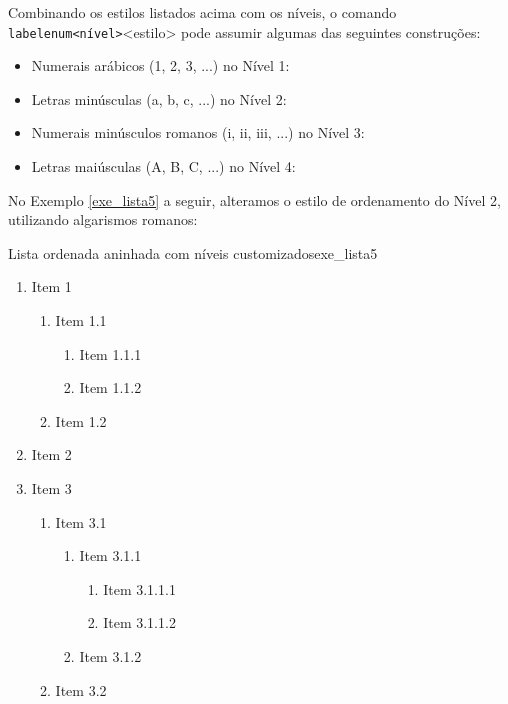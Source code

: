 Combinando os estilos listados acima com os níveis, o comando \texttt{labelenum<nível>}{<estilo>} pode assumir algumas das seguintes construções:

\begin{itemize}
    \item Numerais arábicos (1, 2, 3, ...) no Nível 1:\\
    \texttt{\renewcommand{\labelenumi}{\arabic{enumi}}}
    \item Letras minúsculas (a, b, c, ...) no Nível 2:\\ \texttt{\renewcommand{\labelenumii}{\alph{enumii}}}
    \item Numerais minúsculos romanos (i, ii, iii, ...) no Nível 3:\\ \texttt{\renewcommand{\labelenumiii}{\roman{enumiii}}}
    \item Letras maiúsculas (A, B, C, ...) no Nível 4:\\ \texttt{\renewcommand{\labelenumiv}{\Alph{enumiv}}}
\end{itemize}

No Exemplo \ref{exe_lista5} a seguir, alteramos o estilo de ordenamento do Nível 2, utilizando algarismos romanos:

\begin{texexptitled}[breakable,enhanced,middle=2mm]{Lista ordenada aninhada com níveis customizados}{exe_lista5}
\renewcommand{\labelenumi}{\arabic{enumi}}
\renewcommand{\labelenumii}{\alph{enumii}}
\renewcommand{\labelenumiii}{\roman{enumiii}}
\renewcommand{\labelenumiv}{\Alph{enumiv}}
\begin{enumerate}
    \item Item 1
    \begin{enumerate}
        \item Item 1.1
        \begin{enumerate}
            \item Item 1.1.1
            \item Item 1.1.2
        \end{enumerate}
        \item Item 1.2
    \end{enumerate}
    \item Item 2
    \item Item 3
    \begin{enumerate}
        \item Item 3.1
         \begin{enumerate}
            \item Item 3.1.1
            \begin{enumerate}
                \item Item 3.1.1.1
                \item Item 3.1.1.2
            \end{enumerate}
            \item Item 3.1.2
        \end{enumerate}
        \item Item 3.2
    \end{enumerate}
\end{enumerate}
\end{texexptitled}

